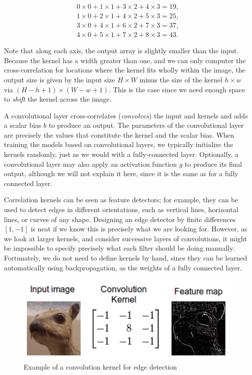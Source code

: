 \begin{align*}
0 \times 0+1 \times 1+3 \times 2+4 \times 3=19,\\
1 \times 0+2 \times 1+4 \times 2+5 \times 3=25,\\
3 \times 0+4 \times 1+6 \times 2+7 \times 3=37,\\
4 \times 0+5 \times 1+7 \times 2+8 \times 3=43.
\end{align*}

Note that along each axis, the output array is slightly smaller than the input. Because the kernel has a width greater than one, and we can only computer the cross-correlation for locations where the kernel fits wholly within the image, the output size is given by the input size $H \times W$  minus the size of the kernel $h \times w$ via $(H-h+1)\times(W-w+1)$. This is the case since we need enough space to \textit{shift} the kernel across the image.

A convolutional layer cross-correlates (\textit{convolves}) the input and kernels and adds a scalar bias $b$ to produce an output. The parameters of the convolutional layer are precisely the values that constitute the kernel and the scalar bias. When training the models based on convolutional layers, we typically initialize the kernels randomly, just as we would with a fully-connected layer. Optionally, a convolutional layer may also apply an activation function $g$ to produce its final output, although we will not explain it here, since it is the same as for a fully connected layer.

Correlation kernels can be seen as feature detectors; for example, they can be used to detect edges in different orientations, such as vertical lines, horizontal lines, or curves of any shape. Designing an edge detector by finite differences $[1, -1]$ is neat if we know this is precisely what we are looking for. However, as we look at larger kernels, and consider successive layers of convolutions, it might be impossible to specify precisely what each filter should be doing manually. Fortunately, we do not need to define kernels by hand, since they can be learned automatically using backpropagation, as the weights of a fully connected layer.

\begin{figure}[hpt]
	\centering
	\includegraphics[scale=0.5]{images/app/edge-detection.png}
	\caption{Example of a convolution kernel for edge detection}
	\label{fig:edge-detection}
\end{figure}

